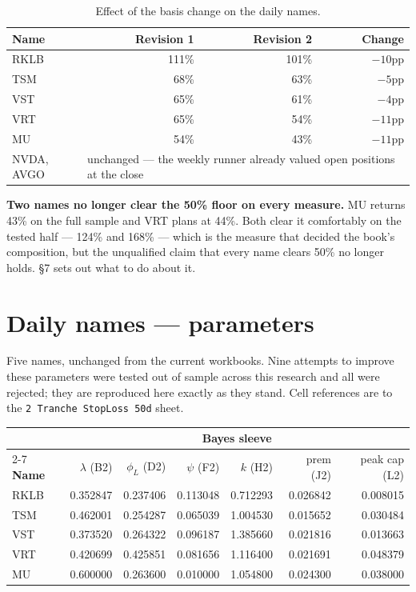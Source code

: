 \documentclass[11pt]{article}
\begin{document}
\begin{table}[H]\centering\small
\begin{tabular}{lrrr}
\toprule
\textbf{Name} & \textbf{Revision 1} & \textbf{Revision 2} & \textbf{Change}\\
\midrule
\rowcolor{bckeep} RKLB & 111\% & 101\% & $-10$pp\\
TSM  & 68\% & 63\% & $-5$pp\\
\rowcolor{bckeep} VST  & 65\% & 61\% & $-4$pp\\
VRT  & 65\% & 54\% & $-11$pp\\
\rowcolor{bckeep} MU   & 54\% & 43\% & $-11$pp\\
\midrule
NVDA, AVGO & \multicolumn{3}{l}{unchanged --- the weekly runner already valued open positions at
the close}\\
\bottomrule
\end{tabular}
\caption{Effect of the basis change on the daily names.}
\end{table}

\textbf{Two names no longer clear the 50\% floor on every measure.} MU returns 43\% on the full
sample and VRT plans at 44\%. Both clear it comfortably on the tested half --- 124\% and 168\% ---
which is the measure that decided the book's composition, but the unqualified claim that every
name clears 50\% no longer holds. \S7 sets out what to do about it.

\section{Daily names --- parameters}

Five names, unchanged from the current workbooks. Nine attempts to improve these parameters were
tested out of sample across this research and all were rejected; they are reproduced here exactly
as they stand. Cell references are to the \texttt{2 Tranche StopLoss 50d} sheet.

\begin{table}[H]\centering\footnotesize
\setlength{\tabcolsep}{4pt}
\begin{tabular}{lrrrrrr}
\toprule
& \multicolumn{6}{c}{\textbf{Bayes sleeve}}\\
\cmidrule(l){2-7}
\textbf{Name} & $\lambda$ (B2) & $\phi_L$ (D2) & $\psi$ (F2) & $k$ (H2) & prem (J2) &
peak cap (L2)\\
\midrule
\rowcolor{bckeep} RKLB & 0.352847 & 0.237406 & 0.113048 & 0.712293 & 0.026842 & 0.008015\\
TSM  & 0.462001 & 0.254287 & 0.065039 & 1.004530 & 0.015652 & 0.030484\\
\rowcolor{bckeep} VST  & 0.373520 & 0.264322 & 0.096187 & 1.385660 & 0.021816 & 0.013663\\
VRT  & 0.420699 & 0.425851 & 0.081656 & 1.116400 & 0.021691 & 0.048379\\
\rowcolor{bckeep} MU   & 0.600000 & 0.263600 & 0.010000 & 1.054800 & 0.024300 & 0.038000\\
\bottomrule
\end{tabular}
\end{table}
\end{document}
